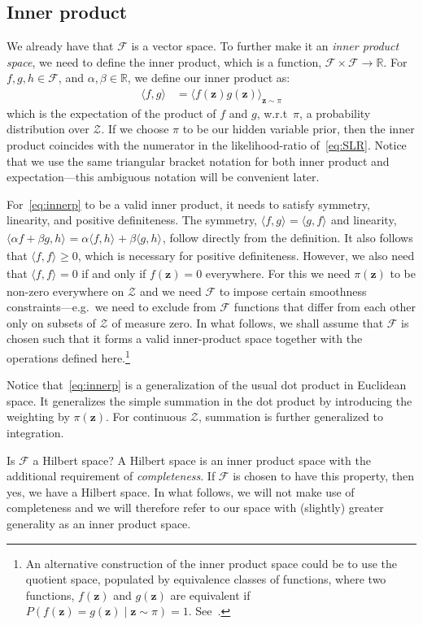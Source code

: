 \documentclass[a4paper,oneside,12pt,english]{report}
\def\zvec{\mathbf{z}}
\def\expv#1#2{\bigl\langle#1\bigr\rangle_{#2}}
\def\R{\mathbb{R}}
\def\Zset{\mathcal{Z}}
\def\Zset{\mathcal{Z}}
\def\Fset{\mathcal{F}}
\def\dot#1#2{\expv{#1,#2}{}}
\begin{document}
\subsection{Inner product}
We already have that $\Fset$ is a vector space. To further make it an \emph{inner product space}, we need to define the inner product, which is a function, $\Fset\times\Fset\to\R$. For $f,g,h\in\Fset$, and $\alpha,\beta\in\R$, we define our inner product as:
\begin{align}
\label{eq:innerp}
\dot{f}{g} &= \expv{f(\zvec)g(\zvec)}{\zvec\sim\pi}
\end{align}
which is the expectation of the product of $f$ and $g$, w.r.t\ $\pi$, a probability distribution over $\Zset$. If we choose $\pi$ to be our hidden variable prior, then the inner product coincides with the numerator in the likelihood-ratio of~\eqref{eq:SLR}. Notice that we use the same triangular bracket notation for both inner product and expectation---this ambiguous notation will be convenient later. 

For~\eqref{eq:innerp} to be a valid inner product, it needs to satisfy symmetry, linearity, and positive definiteness. The symmetry, $\dot{f}{g}=\dot{g}{f}$ and linearity, $\dot{\alpha f+\beta g}{h}=\alpha\dot{f}{h}+\beta\dot{g}{h}$, follow directly from the definition. It also follows that $\dot{f}{f}\ge0$, which is necessary for positive definiteness. However, we also need that $\dot{f}{f}=0$ if and only if $f(\zvec)=0$ everywhere. For this we need $\pi(\zvec)$ to be non-zero everywhere on $\Zset$ and we need $\Fset$ to impose certain smoothness constraints---e.g.\ we need to exclude from $\Fset$ functions that differ from each other only on subsets of $\Zset$ of measure zero. In what follows, we shall assume that $\Fset$ is chosen such that it forms a valid inner-product space together with the operations defined here.\footnote{An alternative construction of the inner product space could be to use the quotient space, populated by equivalence classes of functions, where two functions, $f(\zvec)$ and $g(\zvec)$ are equivalent if $P(f(\zvec)=g(\zvec)\mid \zvec\sim\pi)=1$. See~\cite{random}.}

Notice that~\eqref{eq:innerp} is a generalization of the usual dot product in Euclidean space. It generalizes the simple summation in the dot product by introducing the weighting by $\pi(\zvec)$. For continuous $\Zset$, summation is further generalized to integration.
 
Is $\Fset$ a Hilbert space? A Hilbert space is an inner product space with the additional requirement of \emph{completeness}. If $\Fset$ is chosen to have this property, then yes, we have a Hilbert space. In what follows, we will not make use of completeness and we will therefore refer to our space with (slightly) greater generality as an inner product space.
\end{document}
